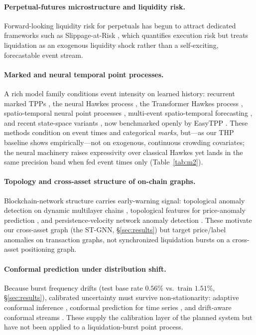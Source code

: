 \documentclass[11pt,a4paper]{article}
\begin{document}
\paragraph{Perpetual-futures microstructure and liquidity risk.} Forward-looking liquidity risk for perpetuals has begun to attract dedicated frameworks such as Slippage-at-Risk \citep{slippageatrisk2026}, which quantifies execution risk but treats liquidation as an exogenous liquidity shock rather than a self-exciting, forecastable event stream.

\paragraph{Marked and neural temporal point processes.} A rich model family conditions event intensity on learned history: recurrent marked TPPs \citep{du2016rmtpp}, the neural Hawkes process \citep{mei2017neuralhawkes}, the Transformer Hawkes process \citep{zuo2020thp}, spatio-temporal neural point processes \citep{zhou2022neuralstpp}, multi-event spatio-temporal forecasting \citep{beyondhawkes2022}, and recent state-space variants \citep{mambahawkes2024}, now benchmarked openly by EasyTPP \citep{xue2023easytpp}. These methods condition on event times and categorical \emph{marks}, but---as our THP baseline shows empirically---not on exogenous, continuous crowding covariates; the neural machinery raises expressivity over classical Hawkes yet lands in the same precision band when fed event times only (Table~\ref{tab:m2}).

\paragraph{Topology and cross-asset structure of on-chain graphs.} Blockchain-network structure carries early-warning signal: topological anomaly detection on dynamic multilayer chains \citep{oforiboateng2021topological}, topological features for price-anomaly prediction \citep{xrp2026topological}, and persistence-velocity network anomaly detection \citep{persistencevelocity2025}. These motivate our cross-asset graph (the ST-GNN, \S\ref{sec:results}) but target price/label anomalies on transaction graphs, not synchronized liquidation bursts on a cross-asset positioning graph.

\paragraph{Conformal prediction under distribution shift.} Because burst frequency drifts (test base rate $0.56\%$ vs.\ train $1.51\%$, \S\ref{sec:results}), calibrated uncertainty must survive non-stationarity: adaptive conformal inference \citep{gibbs2021adaptive}, conformal prediction for time series \citep{zaffran2022adaptive}, and drift-aware conformal streams \citep{driftconformal2026}. These supply the calibration layer of the planned system but have not been applied to a liquidation-burst point process.
\end{document}
